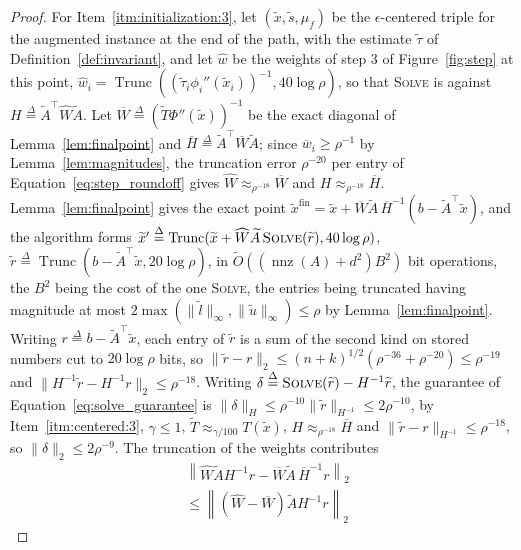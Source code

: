 \documentclass[11pt]{article}
\newcommand{\Trunc}{\operatorname{Trunc}}
\newcommand{\nnz}{\operatorname{nnz}}
\renewcommand{\O}{\widetilde O}
\newcommand{\what}{\widehat{w}}
\newcommand{\tautil}{\widetilde{\tau}}
\newcommand{\defeq}{\stackrel{\Delta}{=}}
\begin{document}
\begin{proof}
For Item~\ref{itm:initialization:3}, let
$(\widetilde{x}, \widetilde{s}, \mu_f)$ be the $\epsilon$-centered
triple for the augmented instance at the end of the path, with the
estimate $\tautil$ of Definition~\ref{def:invariant}, and let
$\what$ be the weights of step 3 of Figure~\ref{fig:step} at this point,
$\what_i = \Trunc((\tautil_i \phi_i''(\widetilde x_i))^{-1}, 40 \log \rho)$,
so that \textsc{Solve} is against
$H \defeq \widetilde{A}^\top \widehat{W} \widetilde{A}$. Let
$\overline W \defeq (\widetilde T \Phi''(\widetilde x))^{-1}$ be the exact
diagonal of Lemma~\ref{lem:finalpoint} and
$\overline H \defeq \widetilde A^\top \overline W \widetilde A$; since
$\overline w_i \ge \rho^{-1}$ by Lemma~\ref{lem:magnitudes}, the
truncation error $\rho^{-20}$ per entry of Equation~\eqref{eq:step_roundoff}
gives
$\widehat W \approx_{\rho^{-18}} \overline W$ and
$H \approx_{\rho^{-18}} \overline H$. Lemma~\ref{lem:finalpoint}
gives the exact point
$\widetilde{x}^{\mathrm{fin}} = \widetilde x + \overline{W} \widetilde A \, \overline H^{-1} (b - \widetilde A^\top \widetilde x)$,
and the algorithm forms
$\widetilde{x}' \defeq \Trunc(\widetilde{x} + \widehat{W} \widetilde{A} \, \textsc{Solve}(\widetilde r), 40 \log \rho)$,
$\widetilde r \defeq \Trunc(b - \widetilde A^\top \widetilde x, 20 \log \rho)$,
in $\O((\nnz(A) + d^{2}) B^{2})$ bit operations, the
$B^{2}$ being the cost of the one \textsc{Solve}, the entries being
truncated having magnitude at most
$2 \max(\|\widetilde l\|_{\infty}, \|\widetilde u\|_{\infty}) \le \rho$
by Lemma~\ref{lem:finalpoint}. Writing
$r \defeq b - \widetilde A^\top \widetilde x$, each entry of
$\widetilde r$ is a sum of the second kind on stored numbers cut to
$20 \log \rho$ bits, so
$\|\widetilde r - r\|_2 \le (n + k)^{1/2} (\rho^{-36} + \rho^{-20}) \le \rho^{-19}$
and
$\|H^{-1} \widetilde r - H^{-1} r\|_2 \le \rho^{-18}$. Writing
$\delta \defeq \textsc{Solve}(\widetilde r) - H^{-1} \widetilde r$, the
guarantee of Equation~\eqref{eq:solve_guarantee} is
$\|\delta\|_{H} \le \rho^{-10} \|\widetilde r\|_{H^{-1}} \le 2 \rho^{-10}$, by
Item~\ref{itm:centered:3}, $\gamma \le 1$,
$\widetilde T \approx_{\gamma / 100} T(\widetilde x)$,
$H \approx_{\rho^{-18}} \overline H$ and
$\|\widetilde r - r\|_{H^{-1}} \le \rho^{-18}$, so
$\|\delta\|_2 \le 2 \rho^{-9}$. The truncation of the weights
contributes
\[
\begin{aligned}
&\left\| \widehat W \widetilde A H^{-1} r
- \overline W \widetilde A \, \overline H^{-1} r \right\|_2
\\
&\le
\left\| \left( \widehat W - \overline W \right) \widetilde A H^{-1} r \right\|_2

\end{aligned}\]
\end{proof}
\end{document}
